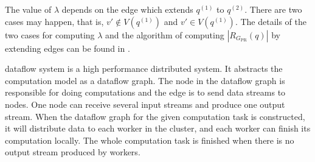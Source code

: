 The value of $\lambda$ depends on the edge which extends $q^{(1)}$ to $q^{(2)}$. There are two cases may happen, that is, $v'\not\in V(q^{(1)})$ and $v'\in V(q^{(1)})$. The details of the two cases for computing $\lambda$ and the algorithm of computing $|R_{G_{\text{PR}}}(q)|$ by extending edges can be found in \cite{Lai2016}.

 \timely dataflow system is a high performance distributed system. It abstracts the computation model as a dataflow graph. The node in the dataflow graph is responsible for doing computations and the edge is to send data streams to nodes. One node can receive several input streams and produce one output stream. When the dataflow graph for the given computation task is constructed, it will distribute data to each worker in the cluster, and each worker can finish its computation locally. The whole computation task is finished when there is no output stream produced by workers.